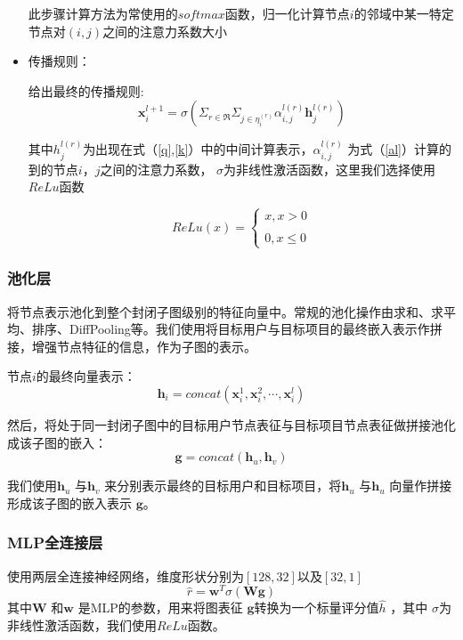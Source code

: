 \documentclass{ctexart}
\begin{document}
\begin{itemize}
    此步骤计算方法为常使用的$softmax$函数，归一化计算节点$i$的邻域中某一特定节点对$(i,j)$之间的注意力系数大小
    \item 传播规则：
    
    给出最终的传播规则:
    \begin{equation}
        \mathbf{x}_i^{l+1}=\sigma(\Sigma_{r\in\mathfrak{R}}\Sigma_{j\in{\eta_{i}^{(r)}}}\alpha_{i,j}^{l(r)}\mathbf{h}_{j}^{l(r)})
    \end{equation}
    
    其中$h_j^{l(r)}$为出现在式（\ref{q},\ref{k}）中的中间计算表示，$\alpha_{i,j}^{l(r)}$ 为式（\ref{al}）计算的到的节点$i$，$j$之间的注意力系数， $\sigma$为非线性激活函数，这里我们选择使用$ReLu$函数

    \begin{equation}
        ReLu(x)=\begin{cases} x,x>0 \\\\ 0,x\leq 0 \end{cases}
    \end{equation}

\end{itemize}
\subsubsection{池化层}
将节点表示池化到整个封闭子图级别的特征向量中。常规的池化操作由求和、求平均、排序、DiffPooling等。我们使用将目标用户与目标项目的最终嵌入表示作拼接，增强节点特征的信息，作为子图的表示。

节点$i$的最终向量表示：
\begin{equation}
    \mathbf{h}_i=concat(\mathbf{x}_i^1,\mathbf{x}_i^2,\cdots,\mathbf{x}_i^l)
\end{equation}

然后，将处于同一封闭子图中的目标用户节点表征与目标项目节点表征做拼接池化成该子图的嵌入：
\begin{equation}
    \mathbf{g}=concat(\mathbf{h}_u,\mathbf{h}_v)
\end{equation}

我们使用$\mathbf{h}_u$ 与$\mathbf{h}_v$ 来分别表示最终的目标用户和目标项目，将$\mathbf{h}_u$ 与$\mathbf{h}_u$ 向量作拼接形成该子图的嵌入表示 $\mathbf{g}$。

\subsubsection{MLP全连接层}
使用两层全连接神经网络，维度形状分别为$[128,32]$以及$[32,1]$
\begin{equation}
    \hat{r}=\mathbf{w}^T\sigma(\mathbf{Wg})
\label{}
\end{equation}
其中$\mathbf{W}$ 和$\mathbf{w}$ 是MLP的参数，用来将图表征 $\mathbf{g}$转换为一个标量评分值$\hat{h}$ ，其中 $\sigma$为非线性激活函数，我们使用$ReLu$函数。
\end{document}
